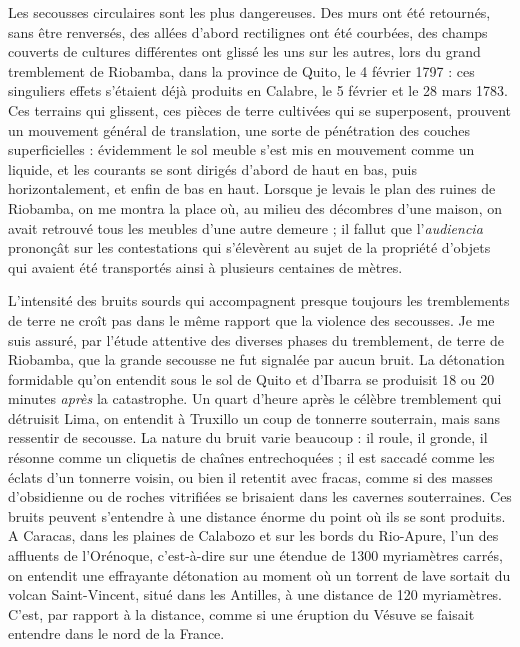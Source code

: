 \documentclass[a4paper, 11pt, oneside]{article}
\begin{document}
Les secousses circulaires sont les plus dangereuses. Des murs ont été retournés, sans être renversés, des allées d'abord rectilignes ont été courbées, des champs couverts de cultures différentes ont glissé les uns sur les autres, lors du grand tremblement de Riobamba, dans la province de Quito, le 4 février 1797 : ces singuliers effets s'étaient déjà produits en Calabre, le 5 février et le 28 mars 1783. Ces terrains qui glissent, ces pièces de terre cultivées qui se superposent, prouvent un mouvement général de translation, une sorte de pénétration des couches superficielles : évidemment le sol meuble s'est mis en mouvement comme un liquide, et les courants se sont dirigés d'abord de haut en bas, puis horizontalement, et enfin de bas en haut. Lorsque je levais le plan des ruines de Riobamba, on me montra la place où, au milieu des décombres d'une maison, on avait retrouvé tous les meubles d'une autre demeure ; il fallut que l'\emph{audiencia} prononçât sur les contestations qui s'élevèrent au sujet de la propriété d'objets qui avaient été transportés ainsi à plusieurs centaines de mètres.

L'intensité des bruits sourds qui accompagnent presque toujours les tremblements de terre ne croît pas dans le même rapport que la violence des secousses. Je me suis assuré, par l'étude attentive des diverses phases du tremblement, de terre de Riobamba, que la grande secousse ne fut signalée par aucun bruit. La détonation formidable qu'on entendit sous le sol de Quito et d'Ibarra se produisit 18 ou 20 minutes \emph{après} la catastrophe. Un quart d'heure après le célèbre tremblement qui détruisit Lima, on entendit à Truxillo un coup de tonnerre souterrain, mais sans ressentir de secousse. La nature du bruit varie beaucoup : il roule, il gronde, il résonne comme un cliquetis de chaînes entrechoquées ; il est saccadé comme les éclats d'un tonnerre voisin, ou bien il retentit avec fracas, comme si des masses d'obsidienne ou de roches vitrifiées se brisaient dans les cavernes souterraines. Ces bruits peuvent s'entendre à une distance énorme du point où ils se sont produits. A Caracas, dans les plaines de Calabozo et sur les bords du Rio-Apure, l'un des affluents de l'Orénoque, c'est-à-dire sur une étendue de 1300 myriamètres carrés, on entendit une effrayante détonation au moment où un torrent de lave sortait du volcan Saint-Vincent, situé dans les Antilles, à une distance de 120 myriamètres. C'est, par rapport à la distance, comme si une éruption du Vésuve se faisait entendre dans le nord de la France.
\end{document}
